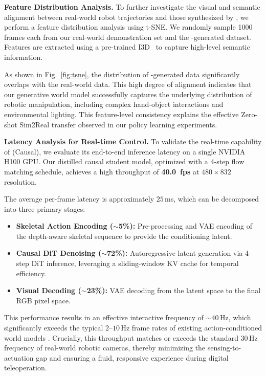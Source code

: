 \noindent 
\textbf{Feature Distribution Analysis.} 
To further investigate the visual and semantic alignment between real-world robot trajectories and those synthesized by \our, we perform a feature distribution analysis using t-SNE. We randomly sample 1000 frames each from our real-world demonstration set and the \our-generated dataset. Features are extracted using a pre-trained I3D~\citep{carreira2017quo} to capture high-level semantic information.

As shown in Fig.~\ref{fig:tsne}, the distribution of \our-generated data significantly overlaps with the real-world data. This high degree of alignment indicates that our generative world model successfully captures the underlying distribution of robotic manipulation, including complex hand-object interactions and environmental lighting. This feature-level consistency explains the effective Zero-shot Sim2Real transfer observed in our policy learning experiments.


\noindent 
\textbf{Latency Analysis for Real-time Control.}
To validate the real-time capability of \our (Causal), we evaluate its end-to-end inference latency on a single NVIDIA H100 GPU. Our distilled causal student model, optimized with a 4-step flow matching schedule, achieves a high throughput of \textbf{40.0~fps} at $480 \times 832$ resolution.

The average per-frame latency is approximately $25$\,ms, which can be decomposed into three primary stages:
\begin{itemize}[leftmargin=*]
    \item \textbf{Skeletal Action Encoding ($\sim$5\%):} Pre-processing and VAE encoding of the depth-aware skeletal sequence to provide the conditioning latent.
    \item \textbf{Causal DiT Denoising ($\sim$72\%):} Autoregressive latent generation via 4-step DiT inference, leveraging a sliding-window KV cache for temporal efficiency.
    \item \textbf{Visual Decoding ($\sim$23\%):} VAE decoding from the latent space to the final RGB pixel space.
\end{itemize}

This performance results in an effective interactive frequency of $\sim$40\,Hz, which significantly exceeds the typical $2$--$10$\,Hz frame rates of existing action-conditioned world models \cite{wang2026hand2world, akkerman2025interdyn}. Crucially, this throughput matches or exceeds the standard $30$\,Hz frequency of real-world robotic cameras, thereby minimizing the sensing-to-actuation gap and ensuring a fluid, responsive experience during digital teleoperation.






